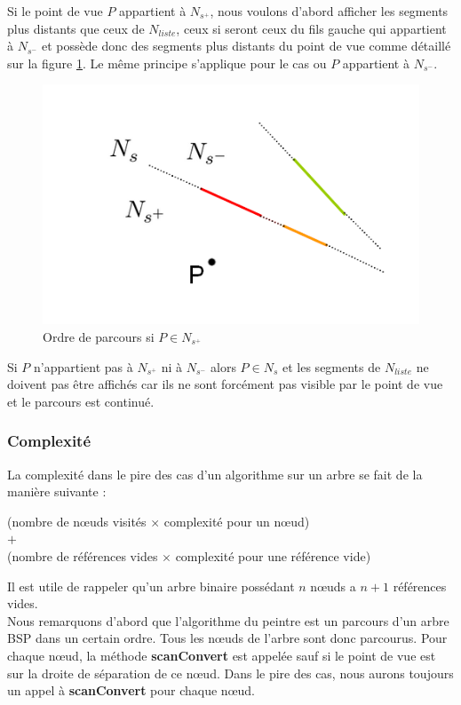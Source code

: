 \documentclass[11pt,a4paper]{article}
\theoremstyle{definition}
\theoremstyle{remark}
\begin{document}
Si le point de vue $P$ appartient à $N_{s^+}$, nous voulons d'abord afficher les segments plus distants que ceux de $N_{liste}$, 
ceux si seront ceux du fils gauche qui appartient à $N_{s^-}$ et possède donc des segments plus distants du point de vue comme détaillé sur la figure \ref{ordre_1}. Le même principe s'applique pour le cas ou $P$ appartient à $N_{s^-}$.

\begin{figure}[!h]
\centering
\includegraphics[scale=0.5]{painter_ordre_1.png}
\caption{Ordre de parcours si $P \in N_{s^+}$ }
\label{ordre_1}
\end{figure}

Si $P$ n'appartient pas à $N_{s^+}$ ni à $N_{s^-}$ alors $P \in N_s$ et les segments de $N_{liste}$ ne doivent pas être affichés car ils ne sont forcément pas visible par le point de vue et le parcours est continué.

\subsubsection{Complexité}
La complexité dans le pire des cas d'un algorithme sur un arbre se fait de la manière suivante :
\begin{center}
(nombre de nœuds visités $\times$ complexité pour un nœud) \\
$+$ \\
(nombre de références vides $\times$ complexité pour une référence vide)
\end{center}
Il est utile de rappeler qu'un arbre binaire possédant $n$ nœuds a $n+1$ références vides.\\

Nous remarquons d'abord que l'algorithme du peintre est un parcours d'un arbre BSP dans un certain ordre. Tous les nœuds de l'arbre sont donc parcourus. Pour chaque nœud, la méthode \textbf{scanConvert} est appelée sauf si le point de vue est sur la droite de séparation de ce nœud. Dans le pire des cas, nous aurons toujours un appel à \textbf{scanConvert} pour chaque nœud.\\
\end{document}
